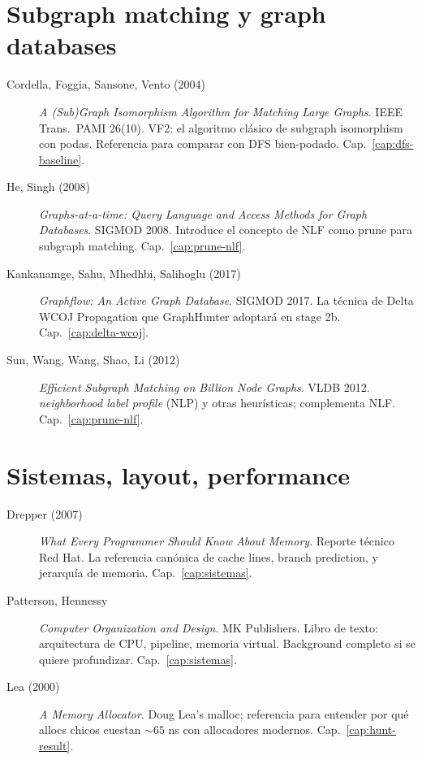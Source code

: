 \section*{Subgraph matching y graph databases}

\begin{description}
    \item[Cordella, Foggia, Sansone, Vento (2004)] \emph{A
    (Sub)Graph Isomorphism Algorithm for Matching Large Graphs}.
    IEEE Trans.\ PAMI 26(10). VF2: el algoritmo clásico de subgraph
    isomorphism con podas. Referencia para comparar con DFS bien-podado.
    Cap.~\ref{cap:dfs-baseline}.

    \item[He, Singh (2008)] \emph{Graphs-at-a-time: Query Language
    and Access Methods for Graph Databases}. SIGMOD 2008. Introduce
    el concepto de NLF como prune para subgraph matching. Cap.~\ref{cap:prune-nlf}.

    \item[Kankanamge, Sahu, Mhedhbi, Salihoglu (2017)] \emph{Graphflow:
    An Active Graph Database}. SIGMOD 2017. La técnica de Delta
    WCOJ Propagation que GraphHunter adoptará en stage 2b.
    Cap.~\ref{cap:delta-wcoj}.

    \item[Sun, Wang, Wang, Shao, Li (2012)] \emph{Efficient Subgraph
    Matching on Billion Node Graphs}. VLDB 2012. \emph{neighborhood
    label profile} (NLP) y otras heurísticas; complementa NLF.
    Cap.~\ref{cap:prune-nlf}.
\end{description}

\section*{Sistemas, layout, performance}

\begin{description}
    \item[Drepper (2007)] \emph{What Every Programmer Should Know
    About Memory}. Reporte técnico Red Hat. La referencia
    canónica de cache lines, branch prediction, y jerarquía de
    memoria. Cap.~\ref{cap:sistemas}.

    \item[Patterson, Hennessy] \emph{Computer Organization and
    Design}. MK Publishers. Libro de texto: arquitectura de CPU,
    pipeline, memoria virtual. Background completo si se quiere
    profundizar. Cap.~\ref{cap:sistemas}.

    \item[Lea (2000)] \emph{A Memory Allocator}. Doug Lea's malloc;
    referencia para entender por qué allocs chicos cuestan
    \(\sim 65\) ns con allocadores modernos. Cap.~\ref{cap:hunt-result}.
\end{description}

